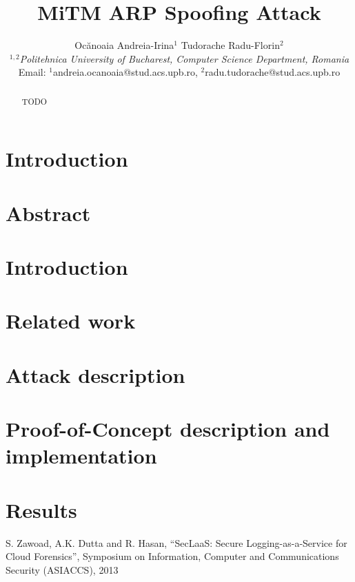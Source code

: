 \documentclass[10pt,a4paper,english,twocolumn]{IEEEtran}
\begin{document}
\title{MiTM ARP Spoofing Attack}

\author{Ocănoaia Andreia-Irina$^{1}$ Tudorache Radu-Florin$^{2}$\\
$^{1,2}$\emph{Politehnica University of Bucharest, Computer Science Department, Romania}\\
Email: $^{1}$andreia.ocanoaia@stud.acs.upb.ro, $^{2}$radu.tudorache@stud.acs.upb.ro}

\maketitle

\begin{abstract}
TODO
\end{abstract}

\section{Introduction}
\section{Abstract}
\section{Introduction}
\section{Related work}
\section{Attack description}
\section{Proof-of-Concept description and implementation}
\section{Results}

\begin{thebibliography}{7}
	S. Zawoad, A.K. Dutta and R. Hasan, ``SecLaaS: Secure Logging-as-a-Service for Cloud Forensics'', {Symposium on Information, Computer and Communications Security (ASIACCS)}, 2013
\end{thebibliography}
\end{document}
